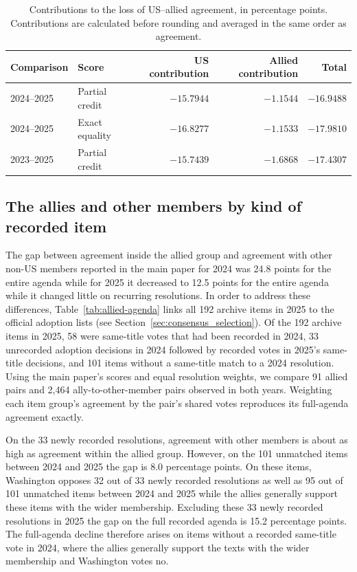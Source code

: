 \documentclass[10pt,authoryear]{elsarticle}
\begin{document}
\begin{table}[ht]
\centering\small
\caption{Contributions to the loss of US--allied agreement, in percentage points. Contributions are calculated before rounding and averaged in the same order as agreement.}
\label{tab:vote_contributions}
\begin{tabular}{llrrr}\toprule
Comparison & Score & US contribution & Allied contribution & Total\\\midrule
2024--2025 & Partial credit & $-15.7944$ & $-1.1544$ & $-16.9488$\\
2024--2025 & Exact equality & $-16.8277$ & $-1.1533$ & $-17.9810$\\
2023--2025 & Partial credit & $-15.7439$ & $-1.6868$ & $-17.4307$\\\bottomrule
\end{tabular}
\end{table}

\subsection{The allies and other members by kind of recorded item}
\label{sec:allied-agenda}

The gap between agreement inside the allied group and agreement with other non-US members reported in the main paper for 2024 was 24.8 points for the entire agenda while for 2025 it decreased to 12.5 points for the entire agenda while it changed little on recurring resolutions. In order to address these differences, Table~\ref{tab:allied-agenda} links all 192 archive items in 2025 to the official adoption lists (see Section~\ref{sec:consensus_selection}). Of the 192 archive items in 2025, 58 were same-title votes that had been recorded in 2024, 33 unrecorded adoption decisions in 2024 followed by recorded votes in 2025’s same-title decisions, and 101 items without a same-title match to a 2024 resolution. Using the main paper’s scores and equal resolution weights, we compare 91 allied pairs and 2,464 ally-to-other-member pairs observed in both years. Weighting each item group’s agreement by the pair’s shared votes reproduces its full-agenda agreement exactly.

On the 33 newly recorded resolutions, agreement with other members is about as high as agreement within the allied group. However, on the 101 unmatched items between 2024 and 2025 the gap is 8.0 percentage points. On these items, Washington opposes 32 out of 33 newly recorded resolutions as well as 95 out of 101 unmatched items between 2024 and 2025 while the allies generally support these items with the wider membership. Excluding these 33 newly recorded resolutions in 2025 the gap on the full recorded agenda is 15.2 percentage points. The full-agenda decline therefore arises on items without a recorded same-title vote in 2024, where the allies generally support the texts with the wider membership and Washington votes no.
\end{document}
